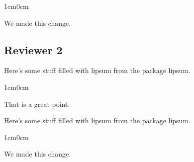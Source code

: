 \documentclass{article}
\newenvironment{response}
	{
	\begin{adjustwidth}{1cm}{0cm}
	\itshape %
	}
	{
	\end{adjustwidth}
	}
\begin{document}
\begin{response}
  We made this change. \\
\end{response}

\subsection*{Reviewer 2}
Here's some stuff filled with lipsum from the package lipsum. \lipsum[2]
\begin{response}
  That is a great point. \\
\end{response}


Here's some stuff filled with lipsum from the package lipsum. \lipsum[2]

\begin{response}
  We made this change. \\
\end{response}
\end{document}
